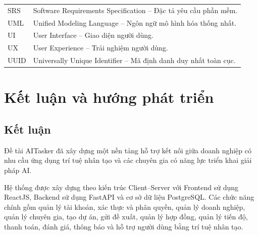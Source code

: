 \documentclass[14pt,a4paper,oneside]{extreport}
\newcommand{\projectname}{AITasker}
\begin{document}
\begin{longtable}{
    L{3cm}
    L{10.5cm}
}
SRS
&
Software Requirements Specification -- Đặc tả yêu cầu phần mềm.
\\

UML
&
Unified Modeling Language -- Ngôn ngữ mô hình hóa thống nhất.
\\

UI
&
User Interface -- Giao diện người dùng.
\\

UX
&
User Experience -- Trải nghiệm người dùng.
\\

UUID
&
Universally Unique Identifier -- Mã định danh duy nhất toàn cục.
\\

\bottomrule

\end{longtable}

\clearpage


\setcounter{page}{1}











\chapter*{Kết luận và hướng phát triển}

\section*{Kết luận}

Đề tài \projectname{} đã xây dựng một nền tảng hỗ trợ kết nối giữa doanh
nghiệp có nhu cầu ứng dụng trí tuệ nhân tạo và các chuyên gia có năng lực
triển khai giải pháp AI.

Hệ thống được xây dựng theo kiến trúc Client--Server với Frontend sử dụng
ReactJS, Backend sử dụng FastAPI và cơ sở dữ liệu PostgreSQL. Các chức năng
chính gồm quản lý tài khoản, xác thực và phân quyền, quản lý doanh nghiệp,
quản lý chuyên gia, tạo dự án, gửi đề xuất, quản lý hợp đồng, quản lý tiến độ,
thanh toán, đánh giá, thông báo và hỗ trợ người dùng bằng trí tuệ nhân tạo.
\end{document}
